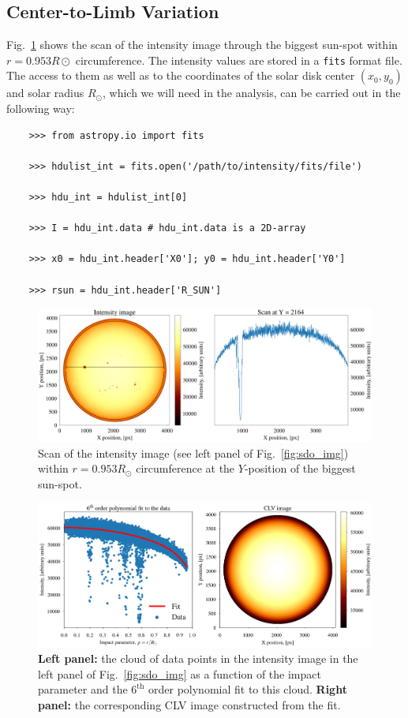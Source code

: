\documentclass[paper=a4, fontsize=11pt]{article}
\numberwithin{equation}{section}
\numberwithin{figure}{section}
\numberwithin{table}{section}
\begin{document}
\subsection{Center-to-Limb Variation}
Fig.~\ref{fig:int_scan} shows the scan of the intensity image through the biggest sun-spot within $r = 0.953R\odot$ circumference.
The intensity values are stored in a \texttt{fits} format file.
The access to them as well as to the coordinates of the solar disk center $(x_0, y_0)$ 
and solar radius $R_\odot$, which we will need in the analysis,
can be carried out in the following way:
\begin{verbatim}
    >>> from astropy.io import fits

    >>> hdulist_int = fits.open('/path/to/intensity/fits/file')

    >>> hdu_int = hdulist_int[0]

    >>> I = hdu_int.data # hdu_int.data is a 2D-array

    >>> x0 = hdu_int.header['X0']; y0 = hdu_int.header['Y0']

    >>> rsun = hdu_int.header['R_SUN']
\end{verbatim}
\begin{figure}[h!]
\centering
\includegraphics[scale=0.303]{int_scan_orig}
\caption[]{Scan of the intensity image (see left panel of Fig.~\ref{fig:sdo_img}) within $r = 0.953R_\odot$ circumference
           at the $Y$-position of the biggest sun-spot.}
\label{fig:int_scan}
\end{figure}
\begin{figure}[h!]
\centering
\includegraphics[scale = 0.483]{clv_img}
\caption[]{\textbf{Left panel:} the cloud of data points in the intensity image 
           in the left panel of Fig.~\ref{fig:sdo_img} as a function of the impact parameter
           and the $6^\mathrm{th}$ order polynomial fit to this cloud.
           \textbf{Right panel:} the corresponding CLV image constructed from the fit.}
\label{fig:clv_img}
\end{figure}
\end{document}
